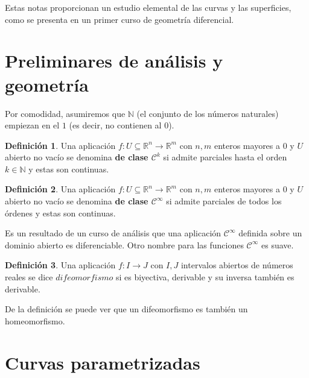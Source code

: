 \documentclass{article}
\author{NyKi}
\date{Enero 2025-}
\theoremstyle{definition}
\newtheorem{define}{Definición}
\newcommand{\reales}{\mathbb{R}}
\newcommand{\naturales}{\mathbb{N}}
\newcommand{\cinfinito}{\mathcal{C}^{\infty}}
\newcommand{\claseck}[1]{\mathcal{C}^{#1}}
\begin{document}
Estas notas proporcionan un estudio elemental de las curvas y las superficies, como se presenta en un primer curso de geometría diferencial.

\section{Preliminares de análisis y geometría}
Por comodidad, asumiremos que $\naturales$ (el conjunto de los números naturales) empiezan en el $1$ (es decir, no contienen al $0$).

\begin{define}
	Una aplicación $f:U\subseteq\reales^n \rightarrow \reales^m$ con $n,m$ enteros mayores a 0 y $U$ abierto no vacío se denomina \textbf{de clase $\claseck{k}$} si admite parciales hasta el orden $k \in \naturales$ y estas son continuas.
\end{define}
\begin{define}
	Una aplicación $f:U\subseteq\reales^n \rightarrow \reales^m$ con $n,m$ enteros mayores a 0 y $U$ abierto no vacío se denomina \textbf{de clase $\cinfinito$} si admite parciales de todos los órdenes y estas son continuas.
\end{define}
Es un resultado de un curso de análisis que una aplicación $\cinfinito$ definida sobre un dominio abierto es diferenciable. Otro nombre para las funciones $\cinfinito$ es suave.
\begin{define}
	Una aplicación $f:I \rightarrow J$ con $I,J$ intervalos abiertos de números reales se dice $difeomorfismo$ si es biyectiva, derivable y su inversa también es derivable.
\end{define}
De la definición se puede ver que un difeomorfismo es también un homeomorfismo.

\section{Curvas parametrizadas}
\end{document}
